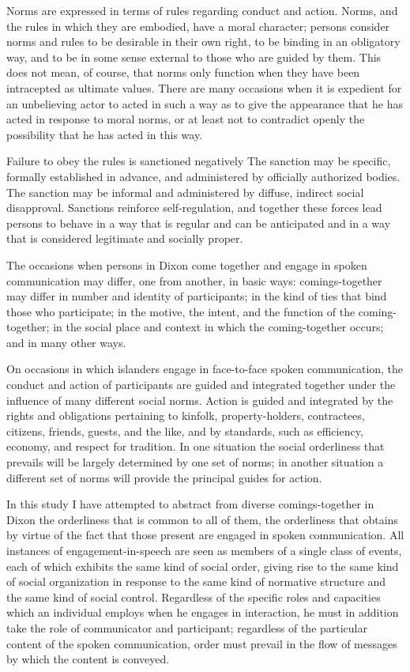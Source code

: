 \documentclass[openany,nobib]{tufte-book}
\begin{document}
Norms are expressed in terms of rules regarding conduct and action.
Norms, and the rules in which they are embodied, have a moral character;
persons consider norms and rules to be desirable in their own right, to
be binding in an obligatory way, and to be in some sense external to
those who are guided by them. This does not mean, of course, that norms
only function when they have been intracepted as ultimate values. There
are many occasions when it is expedient for an unbelieving actor to
acted in such a way as to give the appearance that he has acted in
response to moral norms, or at least not to contradict openly the
possibility that he has acted in this way.

Failure to obey the rules is sanctioned negatively The sanction may be
specific, formally established in advance, and administered by
officially authorized bodies. The sanction may be informal and
administered by diffuse, indirect social disapproval. Sanctions
reinforce self-regulation, and together these forces lead persons to
behave in a way that is regular and can be anticipated and in a way that
is considered legitimate and socially proper.

\newpage The occasions when persons in Dixon come together and engage in spoken
communication may differ, one from another, in basic ways:
comings-together may differ in number and identity of participants; in
the kind of ties that bind those who participate; in the motive, the
intent, and the function of the coming-together; in the social place and
context in which the coming-together occurs; and in many other ways.

On occasions in which islanders engage in face-to-face spoken
communication, the conduct and action of participants are guided and
integrated together under the influence of many different social norms.
Action is guided and integrated by the rights and obligations pertaining
to kinfolk, property-holders, contractees, citizens, friends, guests,
and the like, and by standards, such as efficiency, economy, and respect
for tradition. In one situation the social orderliness that prevails
will be largely determined by one set of norms; in another situation a
different set of norms will provide the principal guides for action.

In this study I have attempted to abstract from diverse comings-together
in Dixon the orderliness that is common to all of them, the orderliness
that obtains by virtue of the fact that those present are engaged in
spoken communication. All instances of engagement-in-speech are seen as
members of a single class of events, each of which exhibits the same
kind of social order, giving rise to the same kind of social
organization in response to the same kind of normative structure and the
same kind of social control. Regardless of the specific roles and
capacities which an individual employs when he engages in interaction,
he must in addition take the role of communicator and participant;
regardless of the particular content of the spoken communication, order
must prevail in the flow of messages by which the content is conveyed.
\end{document}
